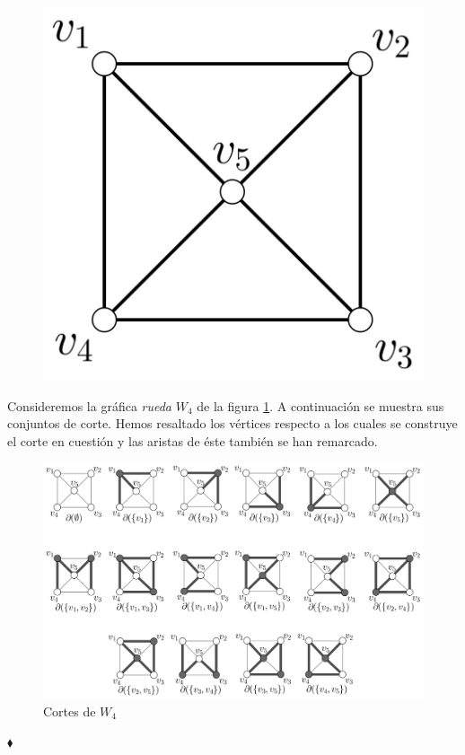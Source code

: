 \begin{ejem}
\begin{figure}[H]
    \centering
    \includegraphics[scale=0.2]{img/imgchapter2/wheel.jpg}
    \caption{}
    \label{fig:wheel}
\end{figure}

Consideremos la gráfica \textit{rueda} $W_{4}$ de la figura \ref{fig:wheel}.
A continuación se muestra sus conjuntos de corte. Hemos resaltado los vértices respecto a los cuales se construye el corte en cuestión y las aristas de éste también se han remarcado. 

\begin{figure}[H]
    \centering
    \includegraphics[width=1\textwidth]{img/imgchapter2/espaciocortes.jpg}
    \caption{Cortes de $W_{4}$}
    \label{fig:cortesw4}
\end{figure}

\hfill $\blacklozenge$
\end{ejem}

